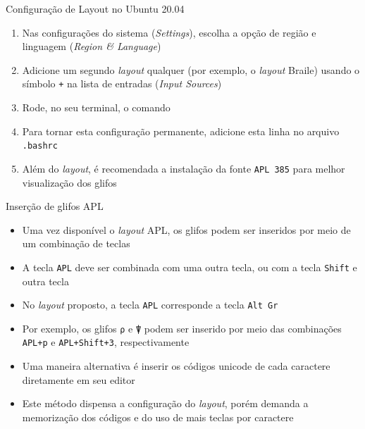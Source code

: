 \begin{frame}[fragile]{Configuração de Layout no Ubuntu 20.04}

    \begin{enumerate}
        \item Nas configurações do sistema (\textit{Settings}), escolha a opção de região e
            linguagem (\textit{Region \& Language})

        \item Adicione um segundo \textit{layout} qualquer (por exemplo, o \textit{layout} Braile)
            usando o símbolo \texttt{+} na lista de entradas (\textit{Input Sources})

        \item Rode, no seu terminal, o comando


        \item Para tornar esta configuração permanente, adicione esta linha no arquivo
            \texttt{.bashrc}

        \item Além do \textit{layout}, é recomendada a instalação da fonte \texttt{APL 385} para
            melhor visualização dos glifos
    \end{enumerate}
\end{frame}

\begin{frame}[fragile]{Inserção de glifos APL}

    \begin{itemize}
        \item Uma vez disponível o \textit{layout} APL, os glifos podem ser inseridos por meio
            de um combinação de teclas

        \item A tecla \texttt{APL} deve ser combinada com uma outra tecla, ou com a tecla
            \texttt{Shift} e outra tecla

        \item No \textit{layout} proposto, a tecla \texttt{APL} corresponde a tecla
            \texttt{Alt Gr}

        \item Por exemplo, os glifos \texttt{⍴} e \texttt{⍒} podem ser inserido por meio das combinações
            \texttt{APL+p} e \texttt{APL+Shift+3}, respectivamente


        \item Uma maneira alternativa é inserir os códigos unicode de cada caractere diretamente
            em seu editor


        \item Este método dispensa a configuração do \textit{layout}, porém demanda a memorização
            dos códigos e do uso de mais teclas por caractere
    \end{itemize}

\end{frame}

